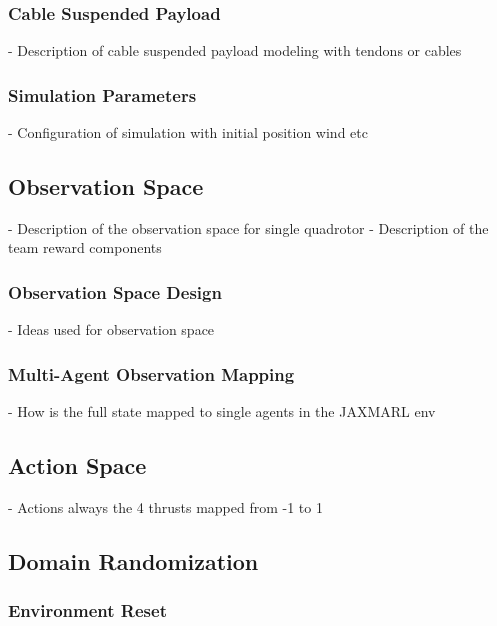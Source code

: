 \subsubsection{Cable Suspended Payload}
- Description of cable suspended payload modeling with tendons or cables
\subsubsection{Simulation Parameters}
- Configuration of simulation with initial position wind etc

\subsection{Observation Space}
- Description of the observation space for single quadrotor
- Description of the team reward components
\subsubsection{Observation Space Design}
- Ideas used for observation space
\subsubsection{Multi-Agent Observation Mapping}
- How is the full state mapped to single agents in the JAXMARL env

\subsection{Action Space}
- Actions always the 4 thrusts mapped from -1 to 1

\subsection{Domain Randomization}
\subsubsection{Environment Reset}

